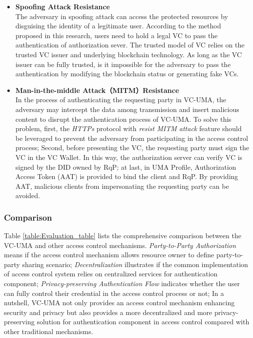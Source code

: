 \documentclass[conference, dvipdfmx]{IEEEtran} %
\begin{document}
\begin{sloppypar}
\begin{itemize}
  \item \textbf{Spoofing Attack Resistance}\\
  The adversary in spoofing attack can access the protected resources by disguising the identity of a legitimate user. 
	According to the method proposed in this research, users need to hold a legal VC to pass the authentication of authorization sever. The trusted model of VC relies on the trusted VC issuer and underlying blockchain technology. As long as the VC issuer can be fully trusted, is it impossible for the adversary to pass the authentication by modifying the blockchain status or generating fake VCs.
  \item \textbf{Man-in-the-middle Attack（MITM）Resistance} \\
  In the process of authenticating the requesting party in VC-UMA, the adversary may intercept the data among transmission and insert malicious content to disrupt the authentication process of VC-UMA. To solve this problem, first, the \textit{HTTPs} protocol with \textit{resist MITM attack} feature should be leveraged to prevent the adversary from participating in the access control process;
  Second, before presenting the VC, the requesting party must sign the VC in the VC Wallet. In this way, the authorization server can verify VC is signed by the DID owned by RqP;  at last, in UMA Profile, Authorization Access Token (AAT) is provided to bind the client and RqP. By providing AAT, malicious clients from impersonating the requesting party can be avoided.
\end{itemize}

\subsubsection{Comparison}

Table \ref{table:Evaluation_table} lists the comprehensive comparison between the VC-UMA and other access control mechanisms. \textit{Party-to-Party Authorization} means if the access control mechanism allows resource owner to define party-to-party sharing  scenario;
\textit{Decentralization} illustrates if the common implementation of access control system relies on centralized services for authentication component; \textit{Privacy-preserving Authentication Flow} indicates whether the user can fully control their credential in the access control process or not;
In a nutshell, VC-UMA not only provides an access control mechanism enhancing security and privacy but also provides a more decentralized and more privacy-preserving solution for authentication component in access control compared with other traditional mechanisms. 


\end{sloppypar}
\end{document}

